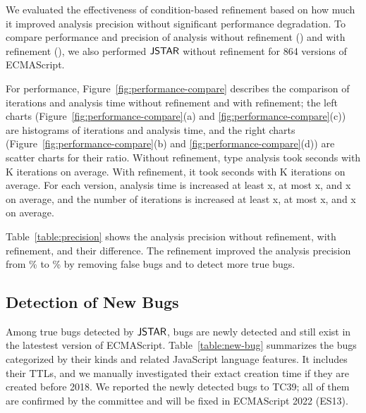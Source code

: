 We evaluated the effectiveness of condition-based refinement based on how much
it improved analysis precision without significant performance degradation.  To
compare performance and precision of analysis without refinement
() and with refinement (), we also performed
$\tool$ without refinement for 864 versions of ECMAScript.

For performance, Figure~\ref{fig:performance-compare} describes the comparison
of iterations and analysis time without refinement and with refinement; the left
charts (Figure~\ref{fig:performance-compare}(a) and
\ref{fig:performance-compare}(c)) are histograms of iterations and analysis
time, and the right charts (Figure~\ref{fig:performance-compare}(b) and
\ref{fig:performance-compare}(d)) are scatter charts for their ratio.  Without
refinement, type analysis took  seconds with K
iterations on average.  With refinement, it took  seconds with
K iterations on average.  For each version, analysis time is
increased at least x, at most x, and x on
average, and the number of iterations is increased at least x, at
most x, and x on average.

Table~\ref{table:precision} shows the analysis precision without refinement,
with refinement, and their difference.  The refinement improved the analysis
precision from \% to \% by removing  false
bugs and to detect  more true bugs.  


\subsection{Detection of New Bugs}\label{sec:new-bug}

Among  true bugs detected by $\tool$,  bugs are newly
detected and still exist in the latestest version of ECMAScript.
Table~\ref{table:new-bug} summarizes the bugs categorized by their kinds and
related JavaScript language features. It includes their TTLs, and we manually
investigated their extact creation time if they are created before 2018.  We
reported the newly detected bugs to TC39; all of them are confirmed by the
committee and will be fixed in ECMAScript 2022 (ES13).

